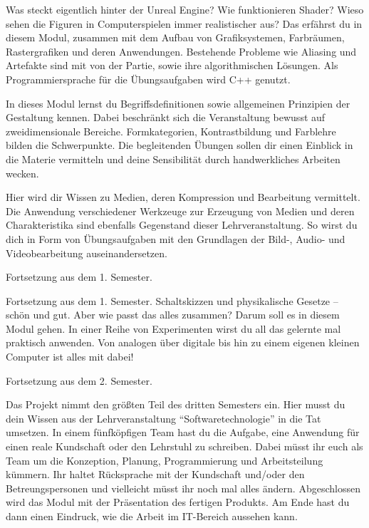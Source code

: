 \label{lec:ecg}
Was steckt eigentlich hinter der Unreal Engine? Wie funktionieren Shader?
Wieso sehen die Figuren in Computerspielen immer realistischer aus?
Das erfährst du in diesem Modul, zusammen mit dem Aufbau von Grafiksystemen, Farbräumen, Rastergrafiken und deren Anwendungen.
Bestehende Probleme wie Aliasing und Artefakte sind mit von der Partie, sowie ihre algorithmischen Lösungen.
Als Programmiersprache für die Übungsaufgaben wird C++ genutzt.

In dieses Modul lernst du Begriffsdefinitionen sowie allgemeinen Prinzipien der Gestaltung kennen.
Dabei beschränkt sich die Veranstaltung bewusst auf zweidimensionale Bereiche.
Formkategorien, Kontrastbildung und Farblehre bilden die Schwerpunkte.
Die begleitenden Übungen sollen dir einen Einblick in die Materie vermitteln und deine Sensibilität durch handwerkliches Arbeiten wecken.

Hier wird dir Wissen zu Medien, deren Kompression und Bearbeitung vermittelt.
Die Anwendung verschiedener Werkzeuge zur Erzeugung von Medien und deren Charakteristika sind ebenfalls Gegenstand dieser Lehrveranstaltung.
So wirst du dich in Form von Übungsaufgaben mit den Grundlagen der Bild-, Audio- und Videobearbeitung auseinandersetzen.

Fortsetzung aus dem 1. Semester.

Fortsetzung aus dem 1. Semester. Schaltskizzen und physikalische Gesetze -- schön und gut. Aber wie passt das alles zusammen?
Darum soll es in diesem Modul gehen. In einer Reihe von Experimenten wirst du all das gelernte mal praktisch anwenden.
Von analogen über digitale bis hin zu einem eigenen kleinen Computer ist alles mit dabei!

\newpage


Fortsetzung aus dem 2. Semester.

Das Projekt nimmt den größten Teil des dritten Semesters ein.
Hier musst du dein Wissen aus der Lehrveranstaltung \enquote{Softwaretechnologie} in die Tat umsetzen.
In einem fünfköpfigen Team hast du die Aufgabe, eine Anwendung für einen reale Kundschaft oder den Lehrstuhl zu schreiben.
Dabei müsst ihr euch als Team um die Konzeption, Planung, Programmierung und Arbeitsteilung kümmern.
Ihr haltet Rücksprache mit der Kundschaft und/oder den Betreungspersonen und vielleicht müsst ihr noch mal alles ändern.
Abgeschlossen wird das Modul mit der Präsentation des fertigen Produkts.
Am Ende hast du dann einen Eindruck, wie die Arbeit im IT-Bereich aussehen kann.


